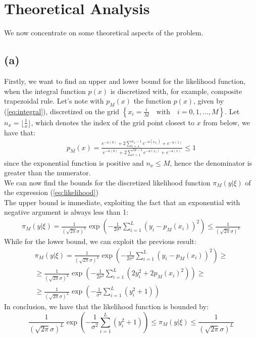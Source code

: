 \documentclass{article}
\begin{document}
\section{Theoretical Analysis}

We now concentrate on some theoretical aspects of the problem.
\subsection*{(a)}
Firstly, we want to find an upper and lower bound for the likelihood function, when the integral function \(p(x)\) is discretized with,
for example, composite trapezoidal rule. Let's note with \(p_M(x)\) the function \(p(x)\), given by (\ref{eq:integral}), discretized on the grid 
$ \left\{ x_i = \frac{i}{M} \quad \text{with} \quad i = 0,1,\dots,M \right\}$. Let $n_x = \lfloor \frac{1}{x} \rfloor$, which denotes the index of the grid point closest to 
$x$ from below, we have that:
\begin{gather*}
    p_M(x) = \frac{e^{-u(0)}+2 \sum_{i=1}^{n_x-1}{e^{-u(x_{n_x})}} + e^{-u(1)} }{e^{-u(0)}+2 \sum_{i=1}^{M-1}{e^{-u(x_i)}} + e^{-u(1)}} \leq 1
\end{gather*}
since the exponential function is positive and $n_x \leq M$, hence the denominator is greater 
than the numerator. \\
We can now find the bounds for the discretized likelihood function \( \pi_M(y|\xi) \) of the expression (\ref{eq:likelihood})\\
The upper bound is immediate, exploiting the fact that 
an exponential with negative argument is always less than 1:
\begin{gather*}
    \pi_M(y|\xi) = \frac{1}{(\sqrt{2\pi}\sigma)^L}\exp\left(-\frac{1}{2\sigma^2}\sum_{i=1}^{L}{(y_i-p_M(x_i))^2}\right) \leq \frac{1}{(\sqrt{2\pi}\sigma)^L}
\end{gather*}
While for the lower bound, we can exploit the previous result:
\begin{gather*}
    \pi_M(y|\xi) = \frac{1}{(\sqrt{2\pi}\sigma)^L}\exp\left(-\frac{1}{2\sigma^2}\sum_{i=1}^{L}{(y_i-p_M(x_i))^2}\right) \geq \\
    \geq \frac{1}{(\sqrt{2\pi}\sigma)^L}\exp\left(-\frac{1}{2\sigma^2}\sum_{i=1}^{L}{\left(2y_i^2+2p_M(x_i)^2\right)}\right) \geq \\
    \geq \frac{1}{(\sqrt{2\pi}\sigma)^L}\exp\left(-\frac{1}{\sigma^2}\sum_{i=1}^{L}{\left(y_i^2 + 1\right)}\right) 
\end{gather*}
In conclusion, we have that the likelihood function is bounded by:
\begin{equation}
    \frac{1}{(\sqrt{2\pi}\sigma)^L}\exp\left(-\frac{1}{\sigma^2}\sum_{i=1}^{L}{\left(y_i^2 + 1\right)}\right) \leq \pi_M(y|\xi) \leq \frac{1}{(\sqrt{2\pi}\sigma)^L}
    \label{eq:likelihood_bounds}
\end{equation}
\end{document}
